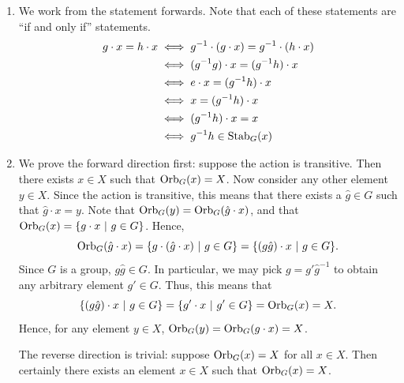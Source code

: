 \begin{enumerate}
    \item We work from the statement forwards. Note that each of these statements are ``if and only if'' statements.
    \begin{align*}
	    g \cdot x = h \cdot x &\iff g^{-1} \cdot (g \cdot x) = g^{-1} \cdot (h \cdot x)\\
	    &\iff (g^{-1}g) \cdot x = (g^{-1}h) \cdot x\\
	    &\iff e \cdot x = (g^{-1}h) \cdot x\\
	    &\iff x = (g^{-1}h) \cdot x\\
	    &\iff (g^{-1}h) \cdot x = x\\
	    &\iff g^{-1}h \in \mathrm{Stab}_{G}(x)
	\end{align*}

	\item We prove the forward direction first: suppose the action is transitive. Then there exists $x \in X$ such that $\mathrm{Orb}_{G}(x) = X$. Now consider any other element $y \in X$. Since the action is transitive, this means that there exists a $\hat{g} \in G$ such that $\hat{g} \cdot x = y$. Note that $\mathrm{Orb}_{G}(y) = \mathrm{Orb}_{G}(\hat{g} \cdot x)$, and that $\mathrm{Orb}_{G}(x) = \{g \cdot x \ | \  g \in G\}$. Hence,
	\[
        \mathrm{Orb}_{G}(\hat{g} \cdot x) = \{g\cdot (\hat{g} \cdot x) \ | \  g \in G\} = \{(g\hat{g}) \cdot x \ | \  g \in G\}.
	\]
	Since $G$ is a group, $g\hat{g} \in G$. In particular, we may pick $g = g'\hat{g}^{-1}$ to obtain any arbitrary element $g' \in G$. Thus, this means that
	\[
        	\{(g\hat{g}) \cdot x \ | \  g \in G\} = \{g' \cdot x \ | \  g' \in G \} = \mathrm{Orb}_{G}(x) = X.
	\]
	Hence, for any element $y \in X$, $\mathrm{Orb}_{G}(y) = \mathrm{Orb}_{G}(g \cdot x) = X$.

	The reverse direction is trivial: suppose $\mathrm{Orb}_{G}(x) = X$ for all $x \in X$. Then certainly there exists an element $x \in X$ such that $\mathrm{Orb}_{G}(x) = X$.


\end{enumerate}
